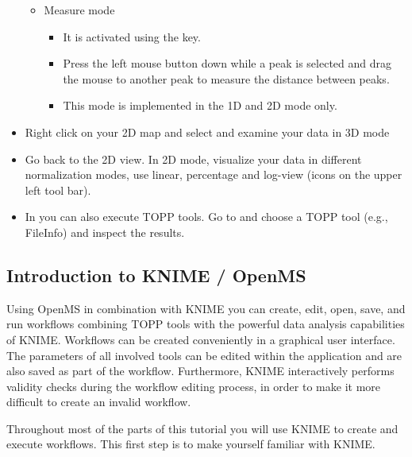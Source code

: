 \begin{itemize}
\begin{itemize}
\begin{itemize}
        \end{itemize}
    \item Measure mode
        \begin{itemize}
        \item It is activated using the \keys{\shift} key.
        \item Press the left mouse button down while a peak is selected and drag the mouse to
        			another peak to measure the distance between peaks.
        \item This mode is implemented in the 1D and 2D mode only.
        \end{itemize}
    \end{itemize}
\item Right click on your 2D map and select  and examine your
			data in 3D mode
\item Go back to the 2D view. In 2D mode, visualize your data in different normalization modes, use linear, percentage and log-view (icons on the upper left tool bar).
\item In  you can also execute TOPP tools. Go to
			 and choose a TOPP tool (e.g., FileInfo) and
			inspect the results.
\end{itemize}


\subsection{Introduction to KNIME / OpenMS}
\label{KNIME_Intro}

Using OpenMS in combination with KNIME you can create, edit, open, save, and run workflows
combining TOPP tools with the powerful data analysis capabilities of KNIME. Workflows can
be created conveniently in a graphical user interface. The parameters of all involved
tools can be edited within the application and are also saved as part of the workflow.
Furthermore, KNIME interactively performs validity checks during the workflow editing
process, in order to make it more difficult to create an invalid workflow.

Throughout most of the parts of this tutorial you will use KNIME to create and
execute workflows. This first step is to make yourself familiar with KNIME.

